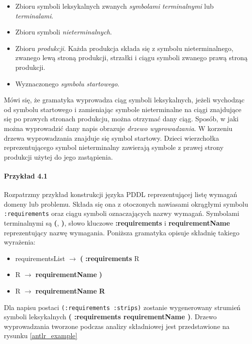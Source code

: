 \begin{itemize}
\item Zbioru symboli leksykalnych zwanych \emph{symbolami terminalnymi} lub \emph{terminalami}.
\item Zbioru symboli \emph{nieterminalnych}.
\item Zbioru \emph{produkcji}. Każda produkcja składa się z symbolu nieterminalnego,
  zwanego lewą stroną produkcji, strzałki i ciągu symboli zwanego prawą stroną produkcji.
\item Wyznaczonego \emph{symbolu startowego}.
\end{itemize}

Mówi się, że gramatyka wyprowadza ciąg symboli leksykalnych, jeżeli wychodząc 
od symbolu startowego i zamieniając symbole nieterminalne na ciągi znajdujące 
się po prawych stronach produkcju, można otrzymać dany ciąg. Sposób, w jaki
można wyprowadzić dany napis obrazuje \emph{drzewo wyprowadzania}. W korzeniu drzewa wyprowadzania
znajduje się symbol startowy. Dzieci wierzchołka reprezentującego symbol nieterminalny
zawierają symbole z prawej strony produkcji użytej do jego zastąpienia.

\paragraph{Przykład 4.1}
Rozpatrzmy przykład konstrukcji języka PDDL reprezentującej listę wymagań domeny lub problemu.
Składa się ona z otoczonych nawiasami okrągłymi symbolu \texttt{:requirements} oraz
ciągu symboli oznaczających nazwy wymagań. Symbolami terminalnymi są 
\textbf{(}, \textbf{)}, słowo kluczowe \textbf{:requirements} i 
\textbf{requirementName} reprezentujący nazwę wymagania. Poniższa gramatyka opisuje
składnię takiego wyrażenia:

\begin{itemize}
\item requirementsList $\rightarrow$ \textbf{(} \textbf{:requirements} R
\item R $\rightarrow$ \textbf{requirementName} \textbf{)}
\item R $\rightarrow$ \textbf{requirementName} \textbf{R}
\end{itemize}

Dla napisu postaci \texttt{(:requirements :strips)} zostanie
wygenerowany strumień symboli leksykalnych \textbf{( :requirements requirementName )}.
Drzewo wyprowadzania tworzone podczas analizy składniowej jest przedstawione 
na rysunku \ref{antlr_example}

